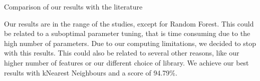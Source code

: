 \documentclass{article}
\begin{document}
    Comparison of our results with the literature
    \begin{table}[ht]
        \centering
        \caption{Comparison of Phishing URL Detection Models}
        \label{tab:model_comparison}
    \end{table}

    Our results are in the range of the studies, except for Random Forest.
    This could be related to a suboptimal parameter tuning, that is time consuming due to the high number of parameters.
    Due to our computing limitations, we decided to stop with this results.
    This could also be related to several other reasons, like our higher number of features or our different choice of library.
    We achieve our best results with kNearest Neighbours and a score of 94.79\%.
\end{document}
